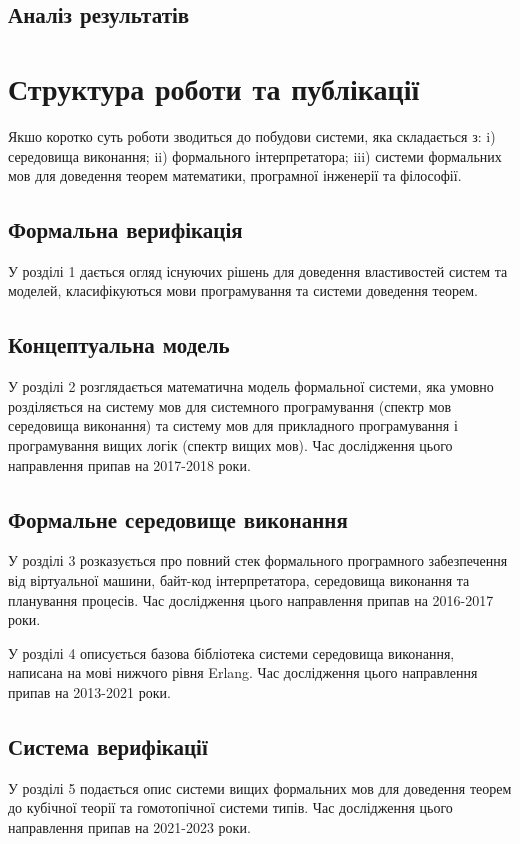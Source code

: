 \subsection{Аналіз результатів}

\newpage
\section{Структура роботи та публікації}
Якшо коротко суть роботи зводиться до побудови системи, яка складається з:
i) середовища виконання; ii) формального інтерпретатора; iii) системи формальних мов
для доведення теорем математики, програмної інженерії та філософії.

\subsection*{Формальна верифікація}
У розділі 1 дається огляд існуючих рішень для доведення
властивостей систем та моделей, класифікуються мови програмування
та системи доведення теорем.

\subsection*{Концептуальна модель}
У розділі 2 розглядається математична модель формальної системи,
яка умовно розділяється на систему мов для системного
програмування (спектр мов середовища виконання) та систему мов для
прикладного програмування і програмування вищих логік (спектр вищих мов).
Час дослідження цього направлення припав на 2017-2018 роки.

\subsection*{Формальне середовище виконання}
У розділі 3 розказується про повний стек формального програмного забезпечення
від віртуальної машини, байт-код інтерпретатора, середовища виконання
та планування процесів. Час дослідження цього направлення припав на 2016-2017 роки.

У розділі 4 описується базова бібліотека системи середовища виконання,
написана на мові нижчого рівня Erlang.
Час дослідження цього направлення припав на 2013-2021 роки.

\subsection*{Система верифікації}
У розділі 5 подається опис системи вищих формальних мов для доведення теорем до
кубічної теорії та гомотопічної системи типів.
Час дослідження цього направлення припав на 2021-2023 роки.

